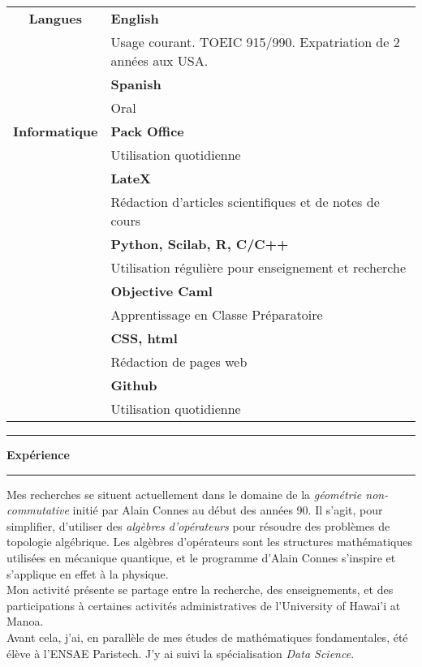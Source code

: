 \documentclass[a4paper,11pt]{article}
\newcommand\espace{\vrule height 20pt width 0pt}
\newcommand{\titre}[1]{%
	\begin{center}
	\bigskip
	\rule{\textwidth}{1pt}
	\par\vspace{0.1cm}
        \textbf{\large #1}
	\par\rule{\textwidth}{1pt}
	\end{center}
	\bigskip
	}
\begin{document}
\begin{tabular}{cp{}}

\textbf{Langues} &  \textbf{English} \\
					& Usage courant. TOEIC 915/990. Expatriation de 2 ann\'ees aux USA.\\
						&  \textbf{Spanish} \\
						& Oral \\
						\espace
\textbf{Informatique} & \textbf{Pack Office} \\	
						& Utilisation quotidienne \\	
						&  \textbf{LateX} \\
						& R\'edaction d'articles scientifiques et de notes de cours \\	
						&  \textbf{Python, Scilab, R, C/C++}\\
						& Utilisation r\'eguli\`ere pour enseignement et recherche \\			
						& \textbf{Objective Caml} \\	
						& Apprentissage en Classe Pr\'eparatoire \\			
						& \textbf{CSS, html} \\
						& R\'edaction de pages web \\			
						& \textbf{Github} \\
						& Utilisation quotidienne\\			
\end{tabular}

\titre{Exp\'erience}
Mes recherches se situent actuellement dans le domaine de la \textit{g\'eom\'etrie non-commutative} initi\'e par Alain Connes au d\'ebut des ann\'ees 90. Il s'agit, pour simplifier, d'utiliser des \textit{alg\`ebres d'op\'erateurs} pour r\'esoudre des probl\`emes de topologie alg\'ebrique. Les alg\`ebres d'op\'erateurs sont les structures math\'ematiques utilis\'ees en m\'ecanique quantique, et le programme d'Alain Connes s'inspire et s'applique en effet \`a la physique.\\

Mon activit\'e pr\'esente se partage entre la recherche, des enseignements, et des participations \`a certaines activit\'es administratives de l'University of Hawai'i at Manoa. \\

Avant cela, j'ai, en parall\`ele de mes \'etudes de math\'ematiques fondamentales, \'et\'e \'el\`eve \`a l'ENSAE Paristech. J'y ai suivi la sp\'ecialisation \textit{Data Science}.\\
\end{document}
